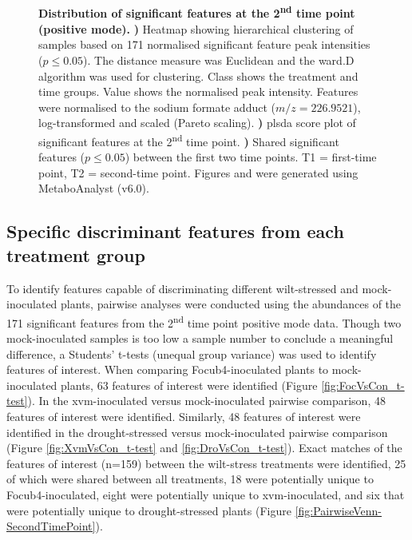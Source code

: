 \begin{figure}[!hptb]
\begin{minipage}[b]{0.57\textwidth}
\begin{subfigure}[b]{\linewidth}
   \end{subfigure}\\[\baselineskip]
  \end{minipage}
  \caption[Distribution of features at the 2\textsuperscript{nd} time point (positive mode).]{\textbf{Distribution of significant features at the 2\textsuperscript{nd} time point (positive mode).}
  \textbf{)} Heatmap showing hierarchical clustering of samples based on 171 normalised significant feature peak intensities ($p \le0.05$). The distance measure was Euclidean and the ward.D algorithm was used for clustering. Class shows the treatment and time groups. Value shows the normalised peak intensity. Features were normalised to the sodium formate   adduct ($m/z=226.9521$), log-transformed and scaled (Pareto scaling). 
  \textbf{)} \acl{plsda} score plot of significant features at the 2\textsuperscript{nd} time point. 
  \textbf{)} Shared significant features ($p \le0.05$) between the first two time points. T1 = first-time point, T2 = second-time point.
  Figures  and  were generated using MetaboAnalyst (v6.0). 
  }
  \label{fig:SecondTimePointSigFig}
\end{figure}

\subsection{Specific discriminant features from each treatment group }

To identify features capable of discriminating different wilt-stressed and mock-inoculated plants, pairwise analyses were conducted using the abundances of the 171 significant features from the 2\textsuperscript{nd} time point positive mode data. Though two mock-inoculated samples is too low a sample number to conclude a meaningful difference, a Students' t-tests (unequal group variance) was used to identify features of interest. When comparing \ac{Focub4}-inoculated plants to mock-inoculated plants, 63 features of interest were identified (Figure \ref{fig:FocVsCon_t-test}). In the \ac{xvm}-inoculated versus mock-inoculated pairwise comparison, 48 features of interest were identified. Similarly, 48 features of interest were identified in the drought-stressed versus mock-inoculated pairwise comparison (Figure \ref{fig:XvmVsCon_t-test} and \ref{fig:DroVsCon_t-test}). Exact matches of the features of interest (n=159) between the wilt-stress treatments were identified, 25 of which were shared between all treatments, 18 were potentially unique to \ac{Focub4}-inoculated, eight were potentially unique to \ac{xvm}-inoculated, and six that were potentially unique to drought-stressed plants (Figure \ref{fig:PairwiseVenn-SecondTimePoint}).

